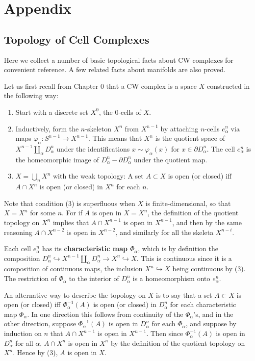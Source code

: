 \documentclass{article}
\theoremstyle{definition}
\begin{document}
\section*{Appendix}

\subsection*{Topology of Cell Complexes}

Here we collect a number of basic topological facts about CW complexes for convenient reference. A few related facts about manifolds are also proved.

Let us first recall from Chapter 0 that a CW complex is a space $X$ constructed in the following way:

\begin{enumerate}
\item Start with a discrete set $X^0$, the 0-cells of $X$.
\item Inductively, form the $n$-skeleton $X^n$ from $X^{n-1}$ by attaching $n$-cells $e_\alpha^n$ via maps $\varphi_\alpha: S^{n-1} \to X^{n-1}$. This means that $X^n$ is the quotient space of $X^{n-1} \coprod_\alpha D_\alpha^n$ under the identifications $x \sim \varphi_\alpha(x)$ for $x \in \partial D_\alpha^n$. The cell $e_\alpha^n$ is the homeomorphic image of $D_\alpha^n - \partial D_\alpha^n$ under the quotient map.
\item $X = \bigcup_n X^n$ with the weak topology: A set $A \subset X$ is open (or closed) iff $A \cap X^n$ is open (or closed) in $X^n$ for each $n$.
\end{enumerate}

Note that condition (3) is superfluous when $X$ is finite-dimensional, so that $X = X^n$ for some $n$. For if $A$ is open in $X = X^n$, the definition of the quotient topology on $X^n$ implies that $A \cap X^{n-1}$ is open in $X^{n-1}$, and then by the same reasoning $A \cap X^{n-2}$ is open in $X^{n-2}$, and similarly for all the skeleta $X^{n-i}$.

Each cell $e_\alpha^n$ has its \textbf{characteristic map} $\Phi_\alpha$, which is by definition the composition $D_\alpha^n \hookrightarrow X^{n-1} \coprod_\alpha D_\alpha^n \to X^n \hookrightarrow X$. This is continuous since it is a composition of continuous maps, the inclusion $X^n \hookrightarrow X$ being continuous by (3). The restriction of $\Phi_\alpha$ to the interior of $D_\alpha^n$ is a homeomorphism onto $e_\alpha^n$.

An alternative way to describe the topology on $X$ is to say that a set $A \subset X$ is open (or closed) iff $\Phi_\alpha^{-1}(A)$ is open (or closed) in $D_\alpha^n$ for each characteristic map $\Phi_\alpha$. In one direction this follows from continuity of the $\Phi_\alpha$'s, and in the other direction, suppose $\Phi_\alpha^{-1}(A)$ is open in $D_\alpha^n$ for each $\Phi_\alpha$, and suppose by induction on $n$ that $A \cap X^{n-1}$ is open in $X^{n-1}$. Then since $\Phi_\alpha^{-1}(A)$ is open in $D_\alpha^n$ for all $\alpha$, $A \cap X^n$ is open in $X^n$ by the definition of the quotient topology on $X^n$. Hence by (3), $A$ is open in $X$.
\end{document}
